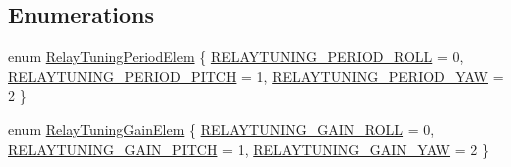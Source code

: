 \subsection*{\-Enumerations}
\begin{DoxyCompactItemize}
\item 
enum \hyperlink{group___relay_tuning_gabcd7d3b7f6002923ffa967c5ae326dc7}{\-Relay\-Tuning\-Period\-Elem} \{ \hyperlink{group___relay_tuning_ggabcd7d3b7f6002923ffa967c5ae326dc7aaa0ea2a1d5ceb441bd57e93595f21dbc}{\-R\-E\-L\-A\-Y\-T\-U\-N\-I\-N\-G\-\_\-\-P\-E\-R\-I\-O\-D\-\_\-\-R\-O\-L\-L} = 0, 
\hyperlink{group___relay_tuning_ggabcd7d3b7f6002923ffa967c5ae326dc7a3ca4ec9d068eebba0351cb5046a1199b}{\-R\-E\-L\-A\-Y\-T\-U\-N\-I\-N\-G\-\_\-\-P\-E\-R\-I\-O\-D\-\_\-\-P\-I\-T\-C\-H} = 1, 
\hyperlink{group___relay_tuning_ggabcd7d3b7f6002923ffa967c5ae326dc7a41655ed1abc199f1b18aae684497cf52}{\-R\-E\-L\-A\-Y\-T\-U\-N\-I\-N\-G\-\_\-\-P\-E\-R\-I\-O\-D\-\_\-\-Y\-A\-W} = 2
 \}
\item 
enum \hyperlink{group___relay_tuning_ga775f0b66b81bbdb20c90bc31636a9b72}{\-Relay\-Tuning\-Gain\-Elem} \{ \hyperlink{group___relay_tuning_gga775f0b66b81bbdb20c90bc31636a9b72a0dafb4883eb397319d5f345f6c9fe668}{\-R\-E\-L\-A\-Y\-T\-U\-N\-I\-N\-G\-\_\-\-G\-A\-I\-N\-\_\-\-R\-O\-L\-L} = 0, 
\hyperlink{group___relay_tuning_gga775f0b66b81bbdb20c90bc31636a9b72a642e1c36d7b3bceef4f92e8a037ae93c}{\-R\-E\-L\-A\-Y\-T\-U\-N\-I\-N\-G\-\_\-\-G\-A\-I\-N\-\_\-\-P\-I\-T\-C\-H} = 1, 
\hyperlink{group___relay_tuning_gga775f0b66b81bbdb20c90bc31636a9b72ad1f4c580143243a26ef4966921dfcca4}{\-R\-E\-L\-A\-Y\-T\-U\-N\-I\-N\-G\-\_\-\-G\-A\-I\-N\-\_\-\-Y\-A\-W} = 2
 \}
\end{DoxyCompactItemize}

